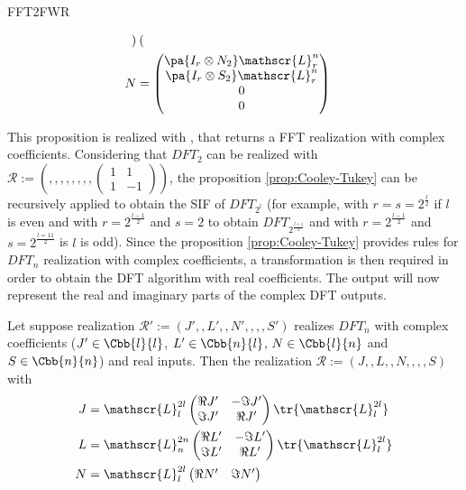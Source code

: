 \begin{command}{FFT2FWR}
\begin{proposition}
\begin{align}
\begin{pmatrix}
\end{pmatrix}\\
N&=\begin{pmatrix}
\pa{I_r \otimes N_2}\mathscr{L}_r^n \\
\pa{I_r \otimes S_2}\mathscr{L}_r^n \\
0 \\ 0
\end{pmatrix} \label{eq:Cooley-Tukey-SIF2}
\end{align}
\end{proposition}
This proposition is realized with , that returns a FFT realization with complex coefficients.
Considering that $DFT_2$ can be realized with $\mathcal{R}:=(,,,,,,,,\begin{pmatrix}1&1\\1&-1\end{pmatrix})$, the proposition \ref{prop:Cooley-Tukey} can be recursively applied to obtain the SIF of $DFT_{2^l}$ (for example, with $r=s=2^{\frac{l}{2}}$ if $l$ is even and with $r=2^{\frac{l-1}{2}}$ and $s=2$ to obtain $DFT_{2^\frac{l+1}{2}}$ and with $r=2^{\frac{l-1}{2}}$ and $s=2^{\frac{l=11}{2}}$ is $l$ is odd).
Since the proposition \ref{prop:Cooley-Tukey} provides rules for $DFT_n$ realization with complex coefficients, a transformation is then required in order to obtain the DFT algorithm with real coefficients. The output will now represent the real and imaginary parts of the complex DFT outputs.
\begin{proposition}\label{prop:complex2real}
Let suppose realization $\mathcal{R}':=(J',,L',,N',,,,S')$ realizes $DFT_n$ with complex coefficients ($J'\in\Cbb{l}{l}$, $L'\in\Cbb{n}{l}$, $N\in\Cbb{l}{n}$ and $S\in\Cbb{n}{n}$) and real inputs. Then the realization $\mathcal{R}:=(J,,L,,N,,,,S)$ with
\begin{align}
J &= \mathscr{L}_l^{2l} \begin{pmatrix} \Re{J'} & -\Im{J'} \\ \Im{J'} & \Re{J'} \end{pmatrix} \tr{\mathscr{L}_{l}^{2l}} \label{eq:com2real-1}\\
L &= \mathscr{L}_n^{2n} \begin{pmatrix} \Re{L'} & -\Im{L'} \\ \Im{L'} & \Re{L'} \end{pmatrix} \tr{\mathscr{L}_{l}^{2l}} \\
N &= \mathscr{L}_l^{2l} \begin{pmatrix}  \Re{N'} & \Im{N'} \end{pmatrix} \\

\end{align}
\end{proposition}
\end{command}
